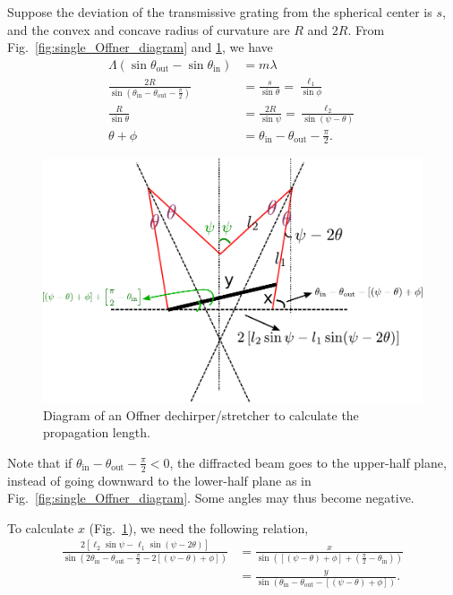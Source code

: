 \documentclass[12pt,hidelinks]{book}
\begin{document}
Suppose the deviation of the transmissive grating from the spherical center is $s$, and the convex and concave radius of curvature are $R$ and $2R$. From Fig.~\ref{fig:single_Offner_diagram} and \ref{fig:Offner_closed_view2}, we have
\begin{subequations}
\begin{align}
\Lambda\left(\sin\theta_{\text{out}}-\sin\theta_{\text{in}}\right) & =m\lambda \\
\frac{2R}{\sin(\theta_{\text{in}}-\theta_{\text{out}}-\frac{\pi}{2})} & =\frac{s}{\sin\theta}=\frac{\ell_1}{\sin\phi} \label{eq:Offner_eq2} \\
\frac{R}{\sin\theta} & =\frac{2R}{\sin\psi}=\frac{\ell_2}{\sin\left(\psi-\theta\right)} \label{eq:Offner_eq3} \\
\theta+\phi & =\theta_{\text{in}}-\theta_{\text{out}}-\frac{\pi}{2}. \label{eq:Offner_eq4} 
\end{align}
\end{subequations}

\begin{figure}[htbp]
\centering
\includegraphics[width=.7\textwidth]{Offner_close_view2.pdf}
\caption{Diagram of an Offner dechirper/stretcher to calculate the propagation length.}
\label{fig:Offner_closed_view2}
\end{figure}

Note that if $\theta_{\text{in}}-\theta_{\text{out}}-\frac{\pi}{2}<0$, the diffracted beam goes to the upper-half plane, instead of going downward to the lower-half plane as in Fig.~\ref{fig:single_Offner_diagram}. Some angles may thus become negative.

To calculate $x$ (Fig.~\ref{fig:Offner_closed_view2}), we need the following relation,
\begin{subequations}
\begin{align}
\frac{2\left[\ell_2\sin\psi-\ell_1\sin(\psi-2\theta)\right]}{\sin(2\theta_{\text{in}}-\theta_{\text{out}}-\frac{\pi}{2}-2\left[\left(\psi-\theta\right)+\phi\right])} & =\frac{x}{\sin(\left[(\psi-\theta)+\phi\right]+(\frac{\pi}{2}-\theta_{\text{in}}))} \\
& =\frac{y}{\sin(\theta_{\text{in}}-\theta_{\text{out}}-\left[(\psi-\theta)+\phi\right])}.
\end{align}
\label{eq:Offner_xy}
\end{subequations}
\end{document}
